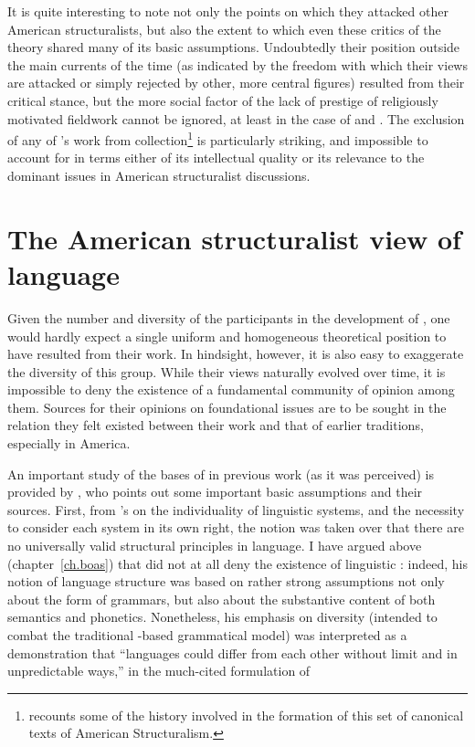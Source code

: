 It is quite interesting to note not only the points on which they
attacked other American structuralists, but also the extent to which
even these critics of the theory shared many of its basic
assumptions. Undoubtedly their position outside the main currents of
the time (as indicated by the freedom with which their views are
attacked or simply rejected by other, more central figures) resulted
from their critical stance, but the more social factor of the lack of
prestige of religiously motivated fieldwork cannot be ignored, at
least in the case of {\Pike} and {\Nida}. The exclusion of any of {\Pike}'s
work from 
collection\footnote{\citet{newmeyer19:joos.readings} recounts some of
  the history involved in the formation of this set of canonical texts
  of American Structuralism.}  is particularly striking, and
impossible to account for in terms either of its intellectual quality
or its relevance to the dominant issues in American structuralist
discussions.

\section{The American structuralist view of language}

Given the number and diversity of the participants in the development
of , one would hardly expect a single uniform
and homogeneous theoretical position to have resulted from their
work. In hindsight, however, it is also easy to exaggerate the
diversity of this group. While their views naturally evolved over
time, it is impossible to deny the existence of a fundamental
community of opinion among them. Sources for their opinions on
foundational issues are to be sought in the relation they felt existed
between their work and that of earlier traditions, especially in
America.

An important study of the bases of  in previous
work (as it was perceived) is provided by \citet{teeter64:triviality},
who points out some important basic assumptions and their
sources. First, from {\Boas}'s  on the individuality of linguistic
systems, and the necessity to consider each system in its own right,
the notion was taken over that there are no universally valid
structural principles in language.  I have argued above
(chapter~\ref{ch.boas}) that {\Boas} did not at all deny the existence of
linguistic : indeed, his notion of language structure was
based on rather strong assumptions not only about the form of
grammars, but also about the substantive content of both semantics and
phonetics. Nonetheless, his emphasis on diversity (intended to combat
the traditional -based grammatical model) was interpreted as a
demonstration that ``languages could differ from each other without
limit and in unpredictable ways,'' in the much-cited formulation of
\citet[96]{joos57:readings}

